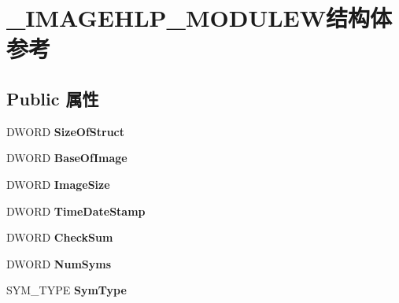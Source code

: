 \hypertarget{struct___i_m_a_g_e_h_l_p___m_o_d_u_l_e_w}{}\section{\+\_\+\+I\+M\+A\+G\+E\+H\+L\+P\+\_\+\+M\+O\+D\+U\+L\+E\+W结构体 参考}
\label{struct___i_m_a_g_e_h_l_p___m_o_d_u_l_e_w}
\subsection*{Public 属性}
\begin{DoxyCompactItemize}
\item 
\mbox{\label{struct___i_m_a_g_e_h_l_p___m_o_d_u_l_e_w_a50422e6a96fa9059cff10f6e9c40aad6}} 
D\+W\+O\+RD {\bfseries Size\+Of\+Struct}
\item 
\mbox{\label{struct___i_m_a_g_e_h_l_p___m_o_d_u_l_e_w_aa6b80e3aa1618ff6b3444881191f8c89}} 
D\+W\+O\+RD {\bfseries Base\+Of\+Image}
\item 
\mbox{\label{struct___i_m_a_g_e_h_l_p___m_o_d_u_l_e_w_a6657d99974dd432a867b653a0ef82523}} 
D\+W\+O\+RD {\bfseries Image\+Size}
\item 
\mbox{\label{struct___i_m_a_g_e_h_l_p___m_o_d_u_l_e_w_a28102c00fadd6966995071a4688baa98}} 
D\+W\+O\+RD {\bfseries Time\+Date\+Stamp}
\item 
\mbox{\label{struct___i_m_a_g_e_h_l_p___m_o_d_u_l_e_w_a4daf8d021c5855ef1ed0ed22d409d373}} 
D\+W\+O\+RD {\bfseries Check\+Sum}
\item 
\mbox{\label{struct___i_m_a_g_e_h_l_p___m_o_d_u_l_e_w_a5fb889b200eb7c59ed555470caf6a441}} 
D\+W\+O\+RD {\bfseries Num\+Syms}
\item 
\mbox{\label{struct___i_m_a_g_e_h_l_p___m_o_d_u_l_e_w_a58ae21f1f01544bfb6abc351764add45}} 
S\+Y\+M\+\_\+\+T\+Y\+PE {\bfseries Sym\+Type}
\item 

\end{DoxyCompactItemize}
